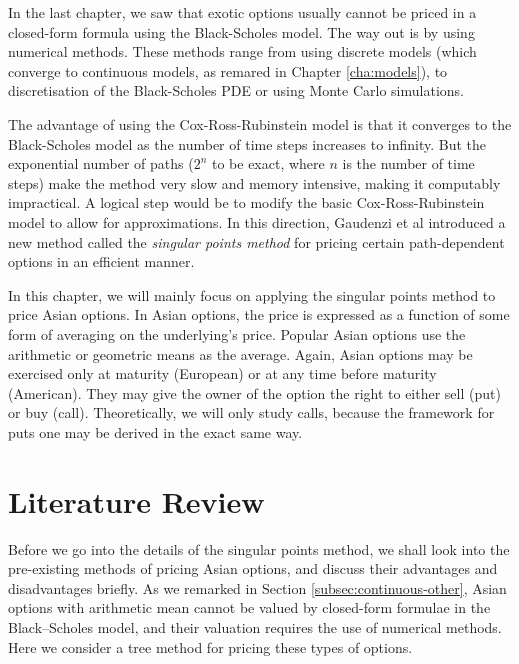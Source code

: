 

In the last chapter, we saw that exotic options usually cannot be priced in a closed-form formula using the Black-Scholes model. The way out is by using numerical methods. These methods range from using discrete models (which converge to continuous models, as remared in Chapter \ref{cha:models}), to discretisation of the Black-Scholes PDE or using Monte Carlo simulations.

The advantage of using the Cox-Ross-Rubinstein model is that it converges to the Black-Scholes model as the number of time steps increases to infinity. But the exponential number of paths ($2^n$ to be exact, where $n$ is the number of time steps) make the method very slow and memory intensive, making it computably impractical. A logical step would be to modify the basic Cox-Ross-Rubinstein model to allow for approximations. In this direction, Gaudenzi et al\cite{Gaudenzi2010} introduced a new method called the \emph{singular points method} for pricing certain path-dependent options in an efficient manner.

In this chapter, we will mainly focus on applying the singular points method to price Asian options. In Asian options, the price is expressed as a function of some form of averaging on the underlying's price. Popular Asian options use the arithmetic or geometric means as the average. Again, Asian options may be exercised only at maturity (European) or at any time before maturity (American). They may give the owner of the option the right to either sell (put) or buy (call). Theoretically, we will only study calls, because the framework for puts one may be derived in the exact same way.



\section{Literature Review}
\label{sec:asian-literature-review}

Before we go into the details of the singular points method, we shall look into the pre-existing methods of pricing Asian options, and discuss their advantages and disadvantages briefly. As we remarked in Section \ref{subsec:continuous-other}, Asian options with arithmetic mean cannot be valued by closed-form formulae in the Black–Scholes model, and their valuation requires the use of numerical methods. Here we consider a tree method for pricing these types of options.

